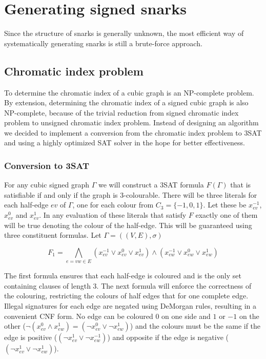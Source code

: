 \chapter{Generating signed snarks}

Since the structure of snarks is generally unknown, the most efficient way of systematically generating snarks is still a brute-force approach.

\section{Chromatic index problem}

To determine the chromatic index of a cubic graph is an NP-complete problem. By extension, determining the chromatic index of a signed cubic graph is also NP-complete, because of the trivial reduction from signed chromatic index problem to unsigned chromatic index problem. Instead of designing an algorithm we decided to implement a conversion from the chromatic index problem to 3SAT and using a highly optimized SAT solver in the hope for better effectiveness.

\subsection{Conversion to 3SAT}

For any cubic signed graph $\Gamma$ we will construct a 3SAT formula $F(\Gamma)$ that is satisfiable if and only if the graph is 3-colourable. There will be three literals for each half-edge $ev$ of $\Gamma$, one for each colour from $C_3 = \{-1, 0, 1\}$. Let these be $x^{-1}_{ev}$, $x^{0}_{ev}$ and $x^{1}_{ev}$. In any evaluation of these literals that satisfy $F$ exactly one of them will be true denoting the colour of the half-edge. This will be guaranteed using three constituent formulas. Let $\Gamma = ((V, E), \sigma)$

$$F_1 = \bigwedge _{e = vw \in E} (x^{-1}_{ev} \vee x^{0}_{ev} \vee x^{1}_{ev}) \wedge (x^{-1}_{ew} \vee x^{0}_{ew} \vee x^{1}_{ew}) $$

The first formula ensures that each half-edge is coloured and is the only set containing clauses of length 3. The next formula will enforce the correctness of the colouring, restricting the colours of half edges that for one complete edge. Illegal signatures for each edge are negated using DeMorgan rules, resulting in a convenient CNF form. No edge can be coloured $0$ on one side and $1$ or $-1$ on the other ($\neg (x^{0}_{ev} \land x^{1}_{ew}) = (\neg x^{0}_{ev} \lor \neg x^{1}_{ew})$) and the colours must be the same if the edge is positive ($(\neg x^{1}_{ev} \lor \neg x^{-1}_{ew})$) and opposite if the edge is negative ($(\neg x^{1}_{ev} \lor \neg x^{1}_{ew})$).

